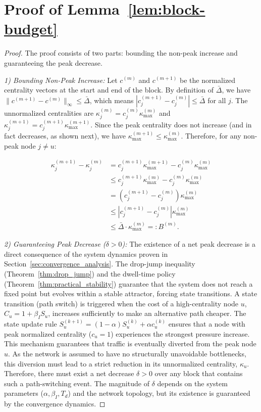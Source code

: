 \documentclass{ccjnl}
\begin{document}

\section{Proof of Lemma~\ref{lem:block-budget}}
\label{app:proof_lem_block_budget}
\begin{proof}
The proof consists of two parts: bounding the non-peak increase and guaranteeing the peak decrease.

\noindent\textit{1) Bounding Non-Peak Increase:}
Let $c^{(m)}$ and $c^{(m+1)}$ be the normalized centrality vectors at the start and end of the block. By definition of $\bar\Delta$, we have $\|c^{(m+1)}-c^{(m)}\|_\infty \le \bar\Delta$, which means $|c^{(m+1)}_j - c^{(m)}_j| \le \bar\Delta$ for all $j$.
The unnormalized centralities are $\kappa^{(m)}_j = c^{(m)}_j \kappa^{(m)}_{\max}$ and $\kappa^{(m+1)}_j = c^{(m+1)}_j \kappa^{(m+1)}_{\max}$.
Since the peak centrality does not increase (and in fact decreases, as shown next), we have $\kappa^{(m+1)}_{\max} \le \kappa^{(m)}_{\max}$.
Therefore, for any non-peak node $j \neq u$:

\begin{align*}
\kappa^{(m+1)}_j - \kappa^{(m)}_j &= c^{(m+1)}_j \kappa^{(m+1)}_{\max} - c^{(m)}_j \kappa^{(m)}_{\max} \\
&\le c^{(m+1)}_j \kappa^{(m)}_{\max} - c^{(m)}_j \kappa^{(m)}_{\max} \\
&= (c^{(m+1)}_j - c^{(m)}_j) \kappa^{(m)}_{\max} \\
&\le |c^{(m+1)}_j - c^{(m)}_j| \kappa^{(m)}_{\max} \\
&\le \bar\Delta \cdot \kappa^{(m)}_{\max} =: B^{(m)}.
\end{align*}

\noindent\textit{2) Guaranteeing Peak Decrease ($\delta>0$):}
The existence of a net peak decrease is a direct consequence of the system dynamics proven in Section~\ref{sec:convergence_analysis}. The drop-jump inequality (Theorem~\ref{thm:drop_jump}) and the dwell-time policy (Theorem~\ref{thm:practical_stability}) guarantee that the system does not reach a fixed point but evolves within a stable attractor, forcing state transitions.
A state transition (path switch) is triggered when the cost of a high-centrality node $u$, $C_u = 1 + \beta_I S_u$, increases sufficiently to make an alternative path cheaper. The state update rule $S_u^{(k+1)} = (1-\alpha)S_u^{(k)} + \alpha c_u^{(k)}$ ensures that a node with peak normalized centrality ($c_u=1$) experiences the strongest pressure increase.
This mechanism guarantees that traffic is eventually diverted from the peak node $u$. As the network is assumed to have no structurally unavoidable bottlenecks, this diversion must lead to a strict reduction in its unnormalized centrality, $\kappa_u$. Therefore, there must exist a net decrease $\delta > 0$ over any block that contains such a path-switching event. The magnitude of $\delta$ depends on the system parameters ($\alpha, \beta_I, T_d$) and the network topology, but its existence is guaranteed by the convergence dynamics.
\end{proof}
\end{document}
